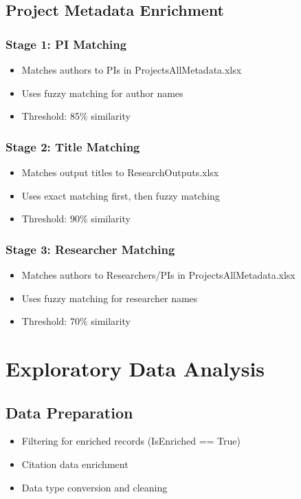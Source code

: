 \documentclass[12pt]{article}
\begin{document}
\subsection{Project Metadata Enrichment}

\subsubsection{Stage 1: PI Matching}
\begin{itemize}
    \item Matches authors to PIs in ProjectsAllMetadata.xlsx
    \item Uses fuzzy matching for author names
    \item Threshold: 85\% similarity
\end{itemize}

\subsubsection{Stage 2: Title Matching}
\begin{itemize}
    \item Matches output titles to ResearchOutputs.xlsx
    \item Uses exact matching first, then fuzzy matching
    \item Threshold: 90\% similarity
\end{itemize}

\subsubsection{Stage 3: Researcher Matching}
\begin{itemize}
    \item Matches authors to Researchers/PIs in ProjectsAllMetadata.xlsx
    \item Uses fuzzy matching for researcher names
    \item Threshold: 70\% similarity
\end{itemize}

\section{Exploratory Data Analysis}

\subsection{Data Preparation}
\begin{itemize}
    \item Filtering for enriched records (IsEnriched == True)
    \item Citation data enrichment
    \item Data type conversion and cleaning
\end{itemize}
\end{document}
